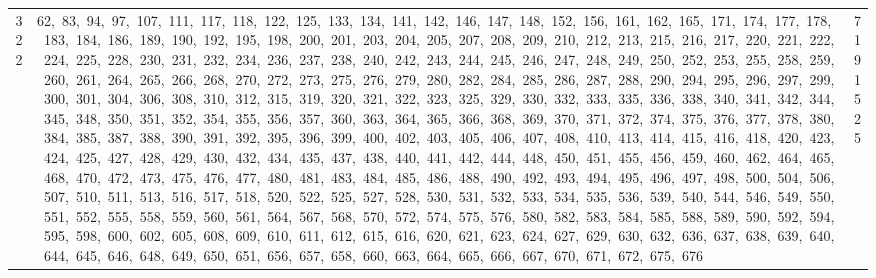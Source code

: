 \begin{longtable}{c|p{}|r}
322 & 62,\ 83,\ 94,\ 97,\ 107,\ 111,\ 117,\ 118,\ 122,\ 125,\ 133,\ 134,\ 141,\ 142,\ 146,\ 147,\ 148,\ 152,\ 156,\ 161,\ 162,\ 165,\ 171,\ 174,\ 177,\ 178,\ 183,\ 184,\ 186,\ 189,\ 190,\ 192,\ 195,\ 198,\ 200,\ 201,\ 203,\ 204,\ 205,\ 207,\ 208,\ 209,\ 210,\ 212,\ 213,\ 215,\ 216,\ 217,\ 220,\ 221,\ 222,\ 224,\ 225,\ 228,\ 230,\ 231,\ 232,\ 234,\ 236,\ 237,\ 238,\ 240,\ 242,\ 243,\ 244,\ 245,\ 246,\ 247,\ 248,\ 249,\ 250,\ 252,\ 253,\ 255,\ 258,\ 259,\ 260,\ 261,\ 264,\ 265,\ 266,\ 268,\ 270,\ 272,\ 273,\ 275,\ 276,\ 279,\ 280,\ 282,\ 284,\ 285,\ 286,\ 287,\ 288,\ 290,\ 294,\ 295,\ 296,\ 297,\ 299,\ 300,\ 301,\ 304,\ 306,\ 308,\ 310,\ 312,\ 315,\ 319,\ 320,\ 321,\ 322,\ 323,\ 325,\ 329,\ 330,\ 332,\ 333,\ 335,\ 336,\ 338,\ 340,\ 341,\ 342,\ 344,\ 345,\ 348,\ 350,\ 351,\ 352,\ 354,\ 355,\ 356,\ 357,\ 360,\ 363,\ 364,\ 365,\ 366,\ 368,\ 369,\ 370,\ 371,\ 372,\ 374,\ 375,\ 376,\ 377,\ 378,\ 380,\ 384,\ 385,\ 387,\ 388,\ 390,\ 391,\ 392,\ 395,\ 396,\ 399,\ 400,\ 402,\ 403,\ 405,\ 406,\ 407,\ 408,\ 410,\ 413,\ 414,\ 415,\ 416,\ 418,\ 420,\ 423,\ 424,\ 425,\ 427,\ 428,\ 429,\ 430,\ 432,\ 434,\ 435,\ 437,\ 438,\ 440,\ 441,\ 442,\ 444,\ 448,\ 450,\ 451,\ 455,\ 456,\ 459,\ 460,\ 462,\ 464,\ 465,\ 468,\ 470,\ 472,\ 473,\ 475,\ 476,\ 477,\ 480,\ 481,\ 483,\ 484,\ 485,\ 486,\ 488,\ 490,\ 492,\ 493,\ 494,\ 495,\ 496,\ 497,\ 498,\ 500,\ 504,\ 506,\ 507,\ 510,\ 511,\ 513,\ 516,\ 517,\ 518,\ 520,\ 522,\ 525,\ 527,\ 528,\ 530,\ 531,\ 532,\ 533,\ 534,\ 535,\ 536,\ 539,\ 540,\ 544,\ 546,\ 549,\ 550,\ 551,\ 552,\ 555,\ 558,\ 559,\ 560,\ 561,\ 564,\ 567,\ 568,\ 570,\ 572,\ 574,\ 575,\ 576,\ 580,\ 582,\ 583,\ 584,\ 585,\ 588,\ 589,\ 590,\ 592,\ 594,\ 595,\ 598,\ 600,\ 602,\ 605,\ 608,\ 609,\ 610,\ 611,\ 612,\ 615,\ 616,\ 620,\ 621,\ 623,\ 624,\ 627,\ 629,\ 630,\ 632,\ 636,\ 637,\ 638,\ 639,\ 640,\ 644,\ 645,\ 646,\ 648,\ 649,\ 650,\ 651,\ 656,\ 657,\ 658,\ 660,\ 663,\ 664,\ 665,\ 666,\ 667,\ 670,\ 671,\ 672,\ 675,\ 676 & 7191525 \\

\end{longtable}
